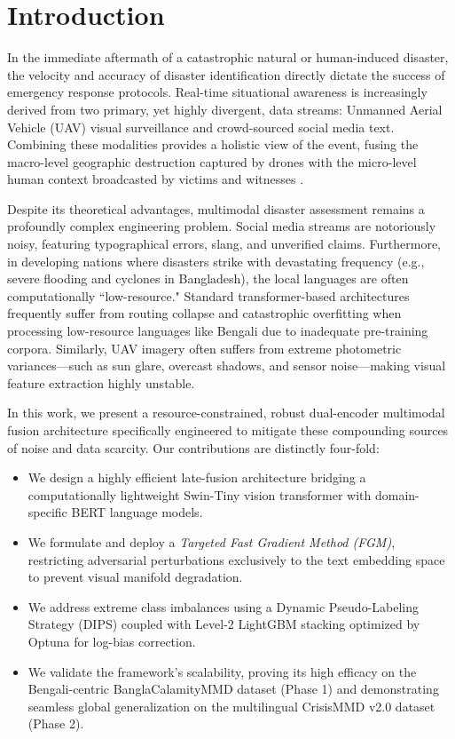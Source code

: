 \documentclass[twoside,twocolumn,10pt]{article}
\begin{document}
\section{Introduction}
\fontsize{11}{13}\selectfont

In the immediate aftermath of a catastrophic natural or human-induced disaster, the velocity and accuracy of disaster identification directly dictate the success of emergency response protocols. Real-time situational awareness is increasingly derived from two primary, yet highly divergent, data streams: Unmanned Aerial Vehicle (UAV) visual surveillance and crowd-sourced social media text. Combining these modalities provides a holistic view of the event, fusing the macro-level geographic destruction captured by drones with the micro-level human context broadcasted by victims and witnesses \cite{crisismmd}.

Despite its theoretical advantages, multimodal disaster assessment remains a profoundly complex engineering problem. Social media streams are notoriously noisy, featuring typographical errors, slang, and unverified claims. Furthermore, in developing nations where disasters strike with devastating frequency (e.g., severe flooding and cyclones in Bangladesh), the local languages are often computationally ``low-resource." Standard transformer-based architectures frequently suffer from routing collapse and catastrophic overfitting when processing low-resource languages like Bengali due to inadequate pre-training corpora. Similarly, UAV imagery often suffers from extreme photometric variances—such as sun glare, overcast shadows, and sensor noise—making visual feature extraction highly unstable. 

In this work, we present a resource-constrained, robust dual-encoder multimodal fusion architecture specifically engineered to mitigate these compounding sources of noise and data scarcity. Our contributions are distinctly four-fold:
\begin{itemize}
    \item We design a highly efficient late-fusion architecture bridging a computationally lightweight Swin-Tiny vision transformer with domain-specific BERT language models.
    \item We formulate and deploy a \textit{Targeted Fast Gradient Method (FGM)}, restricting adversarial perturbations exclusively to the text embedding space to prevent visual manifold degradation.
    \item We address extreme class imbalances using a Dynamic Pseudo-Labeling Strategy (DIPS) coupled with Level-2 LightGBM stacking optimized by Optuna for log-bias correction.
    \item We validate the framework's scalability, proving its high efficacy on the Bengali-centric BanglaCalamityMMD dataset (Phase 1) and demonstrating seamless global generalization on the multilingual CrisisMMD v2.0 dataset (Phase 2).
\end{itemize}
\end{document}
